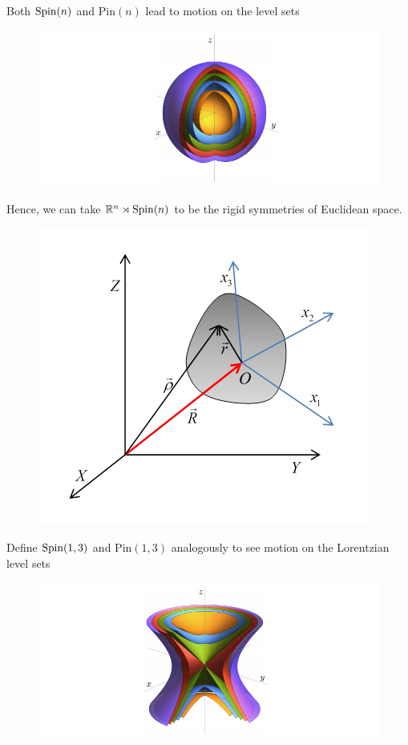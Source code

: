 \documentclass[UKenglish]{beamer}
\begin{document}
\begin{frame}{}
\vfill
\centering Both $\mathrm{Spin}(n)$ and $\mathrm{Pin}(n)$ lead to motion on the level sets
\begin{figure}[H]
\centering
\includegraphics[width=.8\textwidth]{figures/euclidean.png}
\end{figure}
\end{frame}

\begin{frame}{}
\vfill
Hence, we can take $\mathbb{R}^n \rtimes \mathrm{Spin}(n)$ to be the rigid symmetries of Euclidean space.
\begin{figure}[H]
\centering
\includegraphics[width=.5\textwidth]{figures/rigid_body.png}
\end{figure} 
\vfill
\end{frame}

\begin{frame}{}
\vfill
\centering Define $\mathrm{Spin}(1,3)$ and $\mathrm{Pin}(1,3)$ analogously to see motion on the Lorentzian level sets
\begin{figure}[H]
\centering
\includegraphics[width=.8\textwidth]{figures/lorentzian.png}
\end{figure}
\end{frame}
\end{document}
